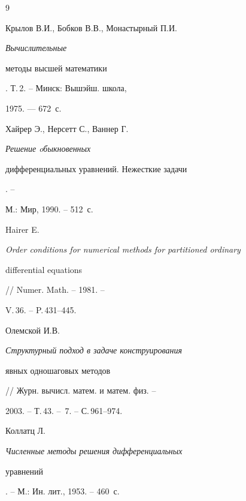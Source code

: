 \begin{thebibliography}{9}







Крылов В.И., Бобков В.В., Монастырный П.И. {\em Вычислительные


методы высшей математики}. Т.\,2. -- Минск: Вышэйш. школа,


1975. --- 672~с.




Хайрер Э., Нерсетт С., Ваннер Г. {\em Решение oбыкновенных


дифференциальных уравнений. Нежесткие задачи}. -- 


М.: Мир, 1990. -- 512~с.




Hairer E. {\em Order conditions for numerical methods for partitioned ordinary


differential equations} // Numer. Math. -- 1981. --


V.\,36. -- P.\,431--445.




Олемской И.В. {\em Структурный подход в задаче конструирования


явных одношаговых методов} // Журн. вычисл. матем. и матем. физ. --


2003. -- Т.\,43. -- \No\,7. -- С.\,961--974.




Коллатц Л. {\em Численные методы решения дифференциальных


уравнений}. -- М.: Ин. лит., 1953. -- 460~с.





\end{thebibliography}





\vskip 2cm












\label{end}









